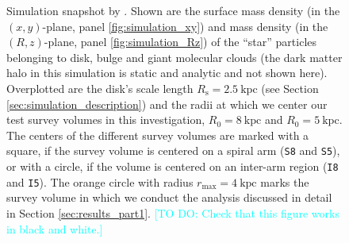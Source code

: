 \documentclass[iop,revtex4,numberedappendix,appendixfloats]{emulateapj}
\newcommand{\Jo}[1]{\textcolor{Cyan}{#1}}
\begin{document}
\begin{figure}[!htbp]
\caption{Simulation snapshot by \citet{2013ApJ...766...34D}. Shown are the surface mass density (in the $(x,y)$-plane, panel \ref{fig:simulation_xy}) and mass density (in the $(R,z)$-plane, panel \ref{fig:simulation_Rz}) of the ``star'' particles belonging to disk, bulge and giant molecular clouds (the dark matter halo in this simulation is static and analytic and not shown here). Overplotted are the disk's scale length $R_\text{s}=2.5~\text{kpc}$ (see Section \ref{sec:simulation_description}) and the radii at which we center our test survey volumes in this investigation, $R_0=8~\text{kpc}$ and $R_0 = 5~\text{kpc}$. The centers of the different survey volumes are marked with a square, if the survey volume is centered on a spiral arm (\texttt{S8} and \texttt{\texttt{S5}}), or with a circle, if the volume is centered on an inter-arm region (\texttt{I8} and \texttt{\texttt{I5}}). The orange circle with radius $r_\text{max}=4~\text{kpc}$ marks the survey volume in which we conduct the analysis discussed in detail in Section \ref{sec:results_part1}. \Jo{[TO DO: Check that this figure works in black and white.]}}
\label{fig:simulation}
\end{figure}
\end{document}

